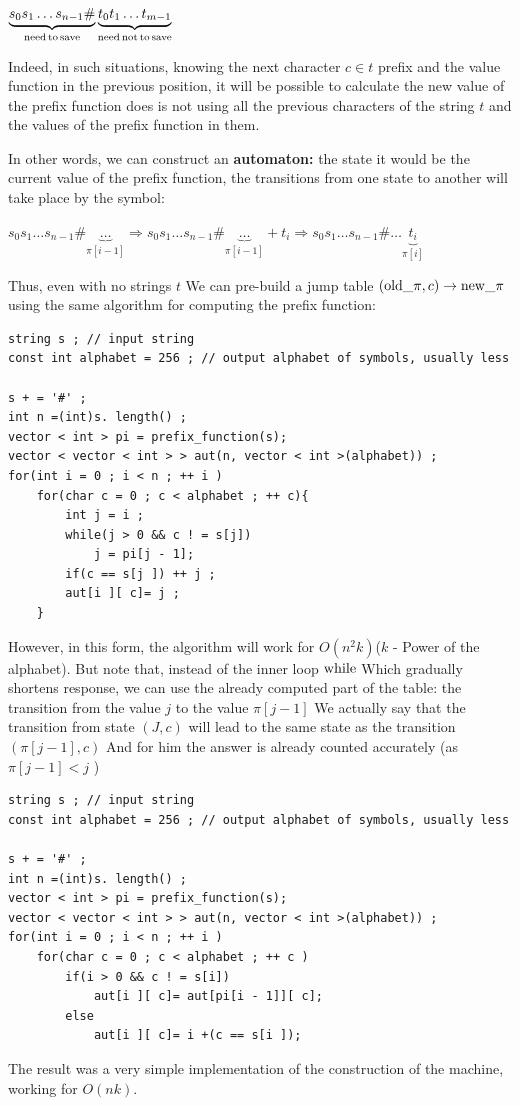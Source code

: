 $\underbrace{s_{0}s_{1}\ldots s_{n-1}\#}_{{\rm need}\,{\rm to}\,{\rm save}}\underbrace{t_{0}t_{1}\ldots t_{m-1}}_{{\rm need}\,{\rm not}\,{\rm to}\,{\rm save}}$

Indeed, in such situations, knowing the next character $c \in t$ prefix and the value function in the previous position, it will be possible to calculate the new value of the prefix function does is not using all the previous characters of the string $t$ and the values ​​of the prefix function in them.

In other words, we can construct an \textbf{automaton:} the state it would be the current value of the prefix function, the transitions from one state to another will take place by the symbol:

$s_{0}s_{1}\ldots s_{n-1}\#\underbrace{\ldots}_{\pi[i-1]}\Rightarrow s_{0}s_{1}\ldots s_{n-1}\#\underbrace{\ldots}_{\pi[i-1]}+t_{i}\Rightarrow s_{0}s_{1}\ldots s_{n-1}\#\ldots\underbrace{t_{i}}_{\pi[i]}$

Thus, even with no strings $t$ We can pre-build a jump table $({\rm old} \_ \pi, c) \rightarrow {\rm new} \_ \pi$ using the same algorithm for computing the prefix function:

\begin{verbatim}
string s ; // input string
const int alphabet = 256 ; // output alphabet of symbols, usually less
 
s + = '#' ;
int n =(int)s. length() ;
vector < int > pi = prefix_function(s);
vector < vector < int > > aut(n, vector < int >(alphabet)) ;
for(int i = 0 ; i < n ; ++ i )
    for(char c = 0 ; c < alphabet ; ++ c){
        int j = i ;
        while(j > 0 && c ! = s[j])
            j = pi[j - 1];
        if(c == s[j ]) ++ j ;
        aut[i ][ c]= j ;
    } 
\end{verbatim}
However, in this form, the algorithm will work for $O (n ^ 2 k)$($k$ - Power of the alphabet). But note that, instead of the inner loop $\rm while$ Which gradually shortens response, we can use the already computed part of the table: the transition from the value $j$ to the value $\pi [j-1]$ We actually say that the transition from state $(J, c)$ will lead to the same state as the transition $(\pi [j-1], c)$ And for him the answer is already counted accurately (as $\pi [j-1] <j$ )

\begin{verbatim}
string s ; // input string
const int alphabet = 256 ; // output alphabet of symbols, usually less
 
s + = '#' ;
int n =(int)s. length() ;
vector < int > pi = prefix_function(s);
vector < vector < int > > aut(n, vector < int >(alphabet)) ;
for(int i = 0 ; i < n ; ++ i )
    for(char c = 0 ; c < alphabet ; ++ c )
        if(i > 0 && c ! = s[i])
            aut[i ][ c]= aut[pi[i - 1]][ c];
        else
            aut[i ][ c]= i +(c == s[i ]); 
\end{verbatim}
The result was a very simple implementation of the construction of the machine, working for $O (n k)$.

